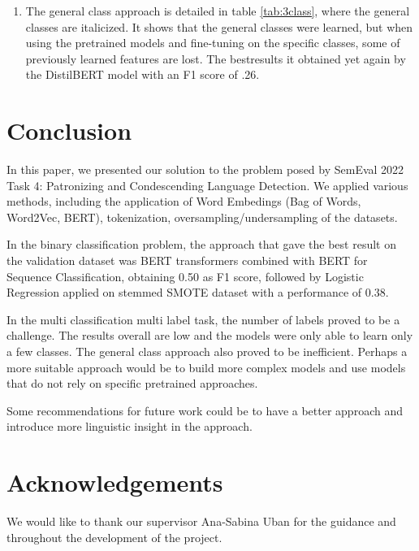\documentclass[11pt]{article}
\begin{document}
\begin{enumerate}
\begin{enumerate}
              \item The general class approach is detailed in table
                  \ref{tab:3class}, where the general classes are italicized.
                  It shows that the general classes were learned, but when
                  using the pretrained models and fine-tuning on the specific
                  classes, some of previously learned features are lost. The
                  bestresults it obtained yet again by the DistilBERT model
                  with an F1 score of .26.


	      \end{enumerate}
\end{enumerate}


\section{Conclusion}

In this paper, we presented our solution to the problem posed by SemEval 2022 Task
4: Patronizing and Condescending Language Detection. We applied
various methods, including the application of Word Embedings (Bag of Words,
Word2Vec, BERT), tokenization, oversampling/undersampling of the datasets.

In the binary classification problem, the approach that gave the best result
on the validation dataset was BERT transformers combined with BERT for
Sequence Classification, obtaining 0.50 as F1 score, followed by Logistic
Regression applied on stemmed SMOTE dataset with a performance of 0.38.

In the multi classification multi label task, the number of labels proved to
be a challenge. The results overall are low and the models were only able to learn
only a few classes. The general class approach also proved to be inefficient.
Perhaps a more suitable approach would be to build more complex models and use
models that do not rely on specific pretrained approaches.

Some recommendations for future work could be to have a better approach and introduce
more linguistic insight in the approach.

\section*{Acknowledgements}

We would like to thank our supervisor Ana-Sabina Uban for the guidance and throughout
the development of the project.




\end{document}
